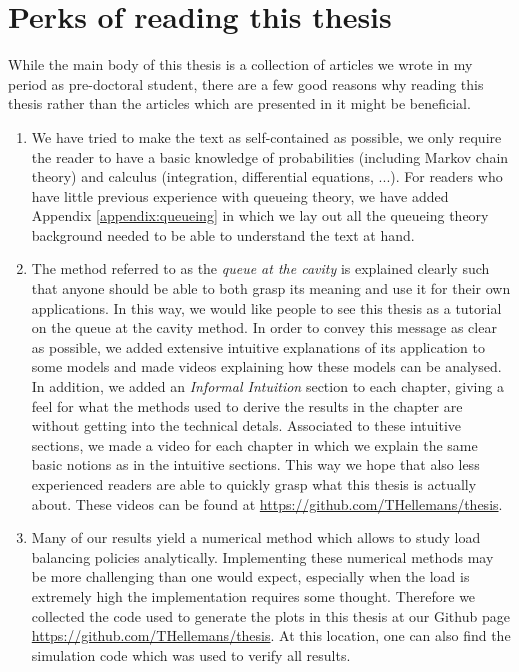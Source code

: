 \documentclass[12pt]{report}
\begin{document}
\section{Perks of reading this thesis}
While the main body of this thesis is a collection of articles we wrote in my period as pre-doctoral student, there are a few good reasons why reading this thesis rather than the articles which are presented in it might be beneficial.
\begin{enumerate}
\item We have tried to make the text as self-contained as possible, we only require the reader to have a basic knowledge of probabilities (including Markov chain theory) and calculus (integration, differential equations, ...). For readers who have little previous experience with queueing theory, we have added Appendix \ref{appendix:queueing} in which we lay out all the queueing theory background needed to be able to understand the text at hand.
\item The method referred to as the \textit{queue at the cavity} is explained clearly such that anyone should be able to both grasp its meaning and use it for their own applications. In this way, we would like people to see this thesis as a tutorial on the queue at the cavity method. In order to convey this message as clear as possible, we added extensive intuitive explanations of its application to some models and made videos explaining how these models can be analysed. In addition, we added an \textit{Informal Intuition} section to each chapter, giving a feel for what the methods used to derive the results in the chapter are without getting into the technical detals. Associated to these intuitive sections, we made a video for each chapter in which we explain the same basic notions as in the intuitive sections. This way we hope that also less experienced readers are able to quickly grasp what this thesis is actually about. These videos can be found at \href{https://github.com/THellemans/thesis}{https://github.com/THellemans/thesis}.
\item Many of our results yield a numerical method which allows to study load balancing policies analytically. Implementing these numerical methods may be more challenging than one would expect, especially when the load is extremely high the implementation requires some thought. Therefore we collected the code used to generate the plots in this thesis at our Github page \href{https://github.com/THellemans/thesis}{https://github.com/THellemans/thesis}. At this location, one can also find the simulation code which was used to verify all results.

\end{enumerate}
\end{document}
